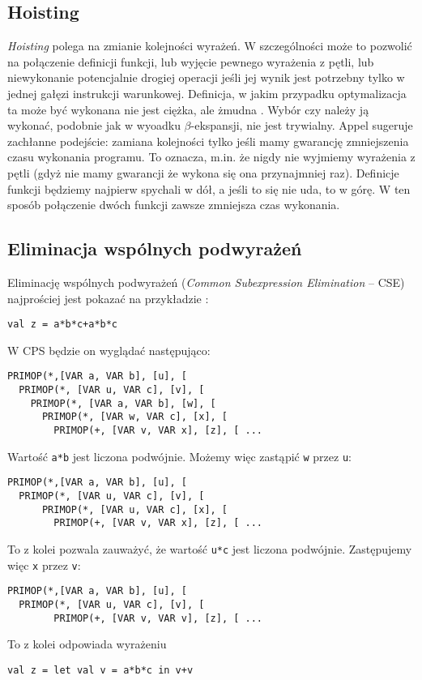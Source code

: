 \documentclass[11pt]{scrartcl}
\begin{document}
\subsection{Hoisting}
\textit{Hoisting} polega na zmianie kolejności wyrażeń. W szczególności może to pozwolić
na połączenie definicji funkcji, lub wyjęcie pewnego wyrażenia z pętli, lub
niewykonanie potencjalnie drogiej operacji jeśli jej wynik jest potrzebny tylko
w jednej gałęzi instrukcji warunkowej. Definicja, w jakim przypadku
optymalizacja ta może być wykonana nie jest ciężka, ale żmudna \cite[Chapter
8.2: Rules for hoisting]{Appel}. Wybór
czy należy ją wykonać, podobnie jak w wyoadku $\beta$-ekspansji, nie jest
trywialny. Appel \cite[Chapter 8.3: Hoisting optimizations]{Appel} sugeruje
zachłanne podejście: zamiana kolejności tylko jeśli mamy gwarancję zmniejszenia
czasu wykonania programu. To oznacza, m.in. że nigdy nie wyjmiemy wyrażenia z pętli
(gdyż nie mamy gwarancji że wykona się ona przynajmniej raz). Definicje funkcji
będziemy najpierw spychali w dół, a jeśli to się nie uda, to w górę. W ten
sposób połączenie dwóch funkcji zawsze zmniejsza czas wykonania.


\subsection{Eliminacja wspólnych podwyrażeń}
Eliminację wspólnych podwyrażeń (\textit{Common Subexpression Elimination} --
CSE) najprościej jest pokazać na przykładzie \cite[Chapter 9: Common subexpressions]{Appel}:
\begin{lstlisting}
val z = a*b*c+a*b*c
\end{lstlisting}

W CPS będzie on wyglądać następująco:
\begin{lstlisting}
PRIMOP(*,[VAR a, VAR b], [u], [
  PRIMOP(*, [VAR u, VAR c], [v], [
    PRIMOP(*, [VAR a, VAR b], [w], [
      PRIMOP(*, [VAR w, VAR c], [x], [
        PRIMOP(+, [VAR v, VAR x], [z], [ ...
\end{lstlisting}

Wartość \lstinline|a*b| jest liczona podwójnie. Możemy więc zastąpić \lstinline|w| przez \lstinline|u|:
\begin{lstlisting}
PRIMOP(*,[VAR a, VAR b], [u], [
  PRIMOP(*, [VAR u, VAR c], [v], [
      PRIMOP(*, [VAR u, VAR c], [x], [
        PRIMOP(+, [VAR v, VAR x], [z], [ ...
\end{lstlisting}

To z kolei pozwala zauważyć, że wartość \lstinline|u*c| jest liczona podwójnie. Zastępujemy więc
\lstinline|x| przez \lstinline|v|:
\begin{lstlisting}
PRIMOP(*,[VAR a, VAR b], [u], [
  PRIMOP(*, [VAR u, VAR c], [v], [
        PRIMOP(+, [VAR v, VAR v], [z], [ ...
\end{lstlisting}
To z kolei odpowiada wyrażeniu
\begin{lstlisting}
val z = let val v = a*b*c in v+v
\end{lstlisting}
\end{document}
